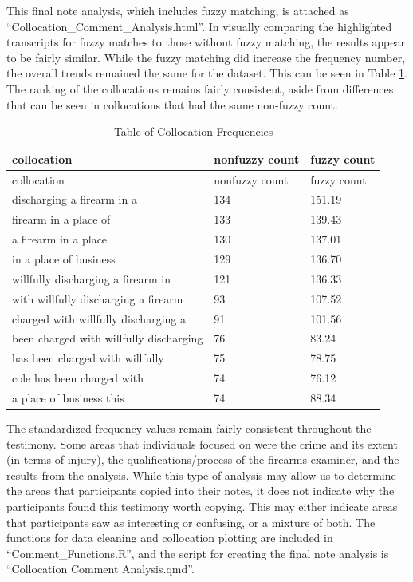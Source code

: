 \documentclass[print]{nuthesis}
\begin{document}
This final note analysis, which includes fuzzy matching, is attached as ``Collocation\_Comment\_Analysis.html''.
In visually comparing the highlighted transcripts for fuzzy matches to those without fuzzy matching, the results appear to be fairly similar.
While the fuzzy matching did increase the frequency number, the overall trends remained the same for the dataset.
This can be seen in Table \ref{tab:nonfuzzycount}.
The ranking of the collocations remains fairly consistent, aside from differences that can be seen in collocations that had the same non-fuzzy count.

\begin{longtable}[]{@{}lll@{}}
\caption{Table of Collocation Frequencies \label{tab:nonfuzzycount}}\tabularnewline
\toprule\noalign{}
collocation & nonfuzzy count & fuzzy count \\
\midrule\noalign{}
\endfirsthead
\toprule\noalign{}
collocation & nonfuzzy count & fuzzy count \\
\midrule\noalign{}
\endhead
\bottomrule\noalign{}
\endlastfoot
discharging a firearm in a & 134 & 151.19 \\
firearm in a place of & 133 & 139.43 \\
a firearm in a place & 130 & 137.01 \\
in a place of business & 129 & 136.70 \\
willfully discharging a firearm in & 121 & 136.33 \\
with willfully discharging a firearm & 93 & 107.52 \\
charged with willfully discharging a & 91 & 101.56 \\
been charged with willfully discharging & 76 & 83.24 \\
has been charged with willfully & 75 & 78.75 \\
cole has been charged with & 74 & 76.12 \\
a place of business this & 74 & 88.34 \\
\end{longtable}

The standardized frequency values remain fairly consistent throughout the testimony.
Some areas that individuals focused on were the crime and its extent (in terms of injury), the qualifications/process of the firearms examiner, and the results from the analysis.
While this type of analysis may allow us to determine the areas that participants copied into their notes, it does not indicate why the participants found this testimony worth copying.
This may either indicate areas that participants saw as interesting or confusing, or a mixture of both.
The functions for data cleaning and collocation plotting are included in ``Comment\_Functions.R'', and the script for creating the final note analysis is ``Collocation Comment Analysis.qmd''.
\end{document}
